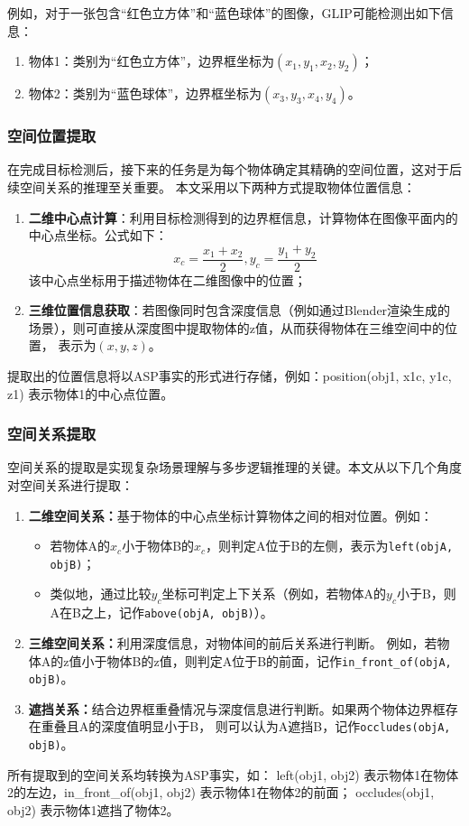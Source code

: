 例如，对于一张包含“红色立方体”和“蓝色球体”的图像，GLIP可能检测出如下信息： 
\begin{enumerate}[itemsep=0pt,parsep=0pt] 
\item 物体1：类别为“红色立方体”，边界框坐标为$(x_1, y_1, x_2, y_2)$； 
\item 物体2：类别为“蓝色球体”，边界框坐标为$(x_3, y_3, x_4, y_4)$。 
\end{enumerate}
\subsubsection{空间位置提取}
在完成目标检测后，接下来的任务是为每个物体确定其精确的空间位置，这对于后续空间关系的推理至关重要。
本文采用以下两种方式提取物体位置信息：
\begin{enumerate}
\item \textbf{二维中心点计算}：利用目标检测得到的边界框信息，计算物体在图像平面内的中心点坐标。公式如下：
$$x_c = \frac{x_1+x_2}{2}, y_c = \frac{y_1 + y_2}{2}$$
该中心点坐标用于描述物体在二维图像中的位置；
\item \textbf{三维位置信息获取}：若图像同时包含深度信息（例如通过Blender渲染生成的场景），则可直接从深度图中提取物体的z值，从而获得物体在三维空间中的位置，
表示为$(x, y, z)$。
\end{enumerate}

提取出的位置信息将以ASP事实的形式进行存储，例如：position(obj1, x1c, y1c, z1) 表示物体1的中心点位置。
\subsubsection{空间关系提取}
空间关系的提取是实现复杂场景理解与多步逻辑推理的关键。本文从以下几个角度对空间关系进行提取：
\begin{enumerate}[label=(\arabic*),itemsep=0.5em] 
\item \textbf{二维空间关系：}基于物体的中心点坐标计算物体之间的相对位置。例如： 
    \begin{itemize}[leftmargin=2em] 
        \item 若物体A的$x_c$小于物体B的$x_c$，则判定A位于B的左侧，表示为\texttt{left(objA, objB)}； 
        \item 类似地，通过比较$y_c$坐标可判定上下关系（例如，若物体A的$y_c$小于B，则A在B之上，记作\texttt{above(objA, objB)}）。 
    \end{itemize} 
\item \textbf{三维空间关系：}利用深度信息，对物体间的前后关系进行判断。
例如，若物体A的z值小于物体B的z值，则判定A位于B的前面，记作\texttt{in\_front\_of(objA, objB)}。 
\item \textbf{遮挡关系：}结合边界框重叠情况与深度信息进行判断。如果两个物体边界框存在重叠且A的深度值明显小于B，
则可以认为A遮挡B，记作\texttt{occludes(objA, objB)}。 
\end{enumerate}
所有提取到的空间关系均转换为ASP事实，如：
left(obj1, obj2) 表示物体1在物体2的左边，in\_front\_of(obj1, obj2) 表示物体1在物体2的前面；
occludes(obj1, obj2) 表示物体1遮挡了物体2。

